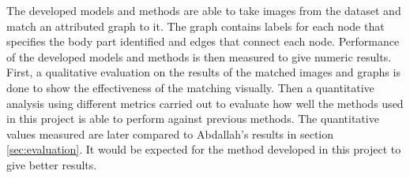 \newcommand{\fourplotall}[4] {
\begin{minipage}{0.48\textwidth}
	\centering
	#1
\end{minipage}
\hspace*{\fill}
\begin{minipage}{0.48\textwidth}
	\centering
	#2
\end{minipage}
\n
\begin{minipage}{0.48\textwidth}
	\centering
	#3
\end{minipage}
\hspace*{\fill}
\begin{minipage}{0.48\textwidth}
	\centering
	#4
\end{minipage}
}

\newcommand{\fourplot}[3]{
\begin{minipage}{0.48\textwidth}
	\centering
	#1{#2}{0.3}{#3}
\end{minipage}
\hspace*{\fill}
\begin{minipage}{0.48\textwidth}
	\centering
	#1{#2}{0.5}{#3}
\end{minipage}
\n
\begin{minipage}{0.48\textwidth}
	\centering
	#1{#2}{0.7}{#3}
\end{minipage}
\hspace*{\fill}
\begin{minipage}{0.48\textwidth}
	\centering
	#1{#2}{0.9}{#3}
\end{minipage}
}

\newcommand{\fourplotlabel}[4]{
\begin{minipage}{0.48\textwidth}
	\centering
	#1{#2}{0.3}{#3}{#4}
\end{minipage}
\hspace*{\fill}
\begin{minipage}{0.48\textwidth}
	\centering
	#1{#2}{0.5}{#3}{#4}
\end{minipage}
\n
\begin{minipage}{0.48\textwidth}
	\centering
	#1{#2}{0.7}{#3}{#4}
\end{minipage}
\hspace*{\fill}
\begin{minipage}{0.48\textwidth}
	\centering
	#1{#2}{0.9}{#3}{#4}
\end{minipage}
}


The developed models and methods are able to take images from the dataset and match an attributed graph to it. The graph contains labels for each node that specifies the body part identified and edges that connect each node. Performance of the developed models and methods is then measured to give numeric results. First, a qualitative evaluation on the results of the matched images and graphs is done to show the effectiveness of the matching visually. Then a quantitative analysis using different metrics carried out to evaluate how well the methods used in this project is able to perform against previous methods. The quantitative values measured are later compared to Abdallah's results in section \ref{sec:evaluation}. It would be expected for the method developed in this project to give better results. 
